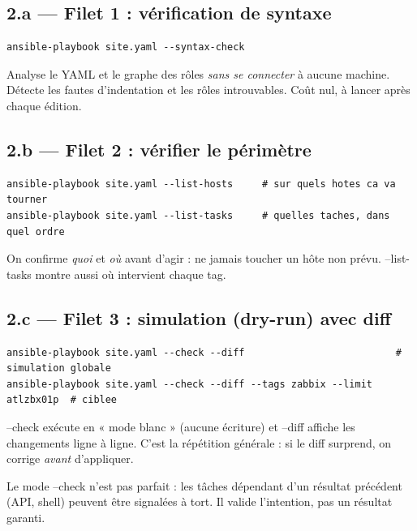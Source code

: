 \documentclass[11pt,a4paper]{article}
\newcommand{\cmd}[1]{{\ttfamily #1}}
\begin{document}
\subsection{2.a — Filet 1 : vérification de syntaxe}
\begin{lstlisting}[style=bash]
ansible-playbook site.yaml --syntax-check
\end{lstlisting}
\begin{pourquoi}
Analyse le YAML et le graphe des rôles \emph{sans se connecter} à aucune machine. Détecte
les fautes d'indentation et les rôles introuvables. Coût nul, à lancer après chaque édition.
\end{pourquoi}

\subsection{2.b — Filet 2 : vérifier le périmètre}
\begin{lstlisting}[style=bash]
ansible-playbook site.yaml --list-hosts     # sur quels hotes ca va tourner
ansible-playbook site.yaml --list-tasks     # quelles taches, dans quel ordre
\end{lstlisting}
\begin{pourquoi}
On confirme \emph{quoi} et \emph{où} avant d'agir : ne jamais toucher un hôte non prévu.
\cmd{--list-tasks} montre aussi où intervient chaque tag.
\end{pourquoi}

\subsection{2.c — Filet 3 : simulation (dry-run) avec diff}
\begin{lstlisting}[style=bash]
ansible-playbook site.yaml --check --diff                          # simulation globale
ansible-playbook site.yaml --check --diff --tags zabbix --limit atlzbx01p  # ciblee
\end{lstlisting}
\begin{pourquoi}
\cmd{--check} exécute en « mode blanc » (aucune écriture) et \cmd{--diff} affiche les
changements ligne à ligne. C'est la répétition générale : si le diff surprend, on corrige
\emph{avant} d'appliquer.
\end{pourquoi}
\begin{attention}
Le mode \cmd{--check} n'est pas parfait : les tâches dépendant d'un résultat précédent
(API, \cmd{shell}) peuvent être signalées à tort. Il valide l'intention, pas un résultat garanti.
\end{attention}
\end{document}
